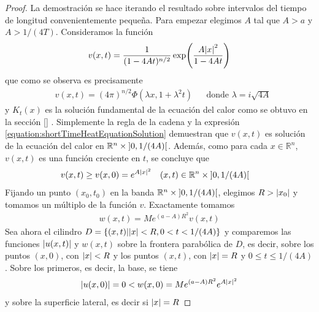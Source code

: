 \documentclass{article}
\newcommand{\realNumbers}{\mathbb{R}}
\theoremstyle{definition}
\theoremstyle{remark}
\newcommand{\leftOpenInterval}{\left]}
\newcommand{\rightOpenInterval}{\right[}
\newcommand{\leftClosedInterval}{\left[}
\newcommand{\rightClosedInterval}{\right]}
\newcommand{\interval}[3]{%
  \ifstrequal{#1}{oo}{%
    \leftOpenInterval #2, #3 \rightOpenInterval%
  }{%
    \ifstrequal{#1}{co}{%
      \leftClosedInterval #2, #3 \rightOpenInterval%
    }{%
      \ifstrequal{#1}{oc}{
        \leftOpenInterval #2, #3 \rightClosedInterval%
      }{%
        \ifstrequal{#1}{cc}{
          \leftClosedInterval #2, #3 \rightClosedInterval
        }{%
        }%
      }%
    }%
  }%
}
\begin{document}
  \begin{proof}
    La demostración se hace iterando el resultado sobre intervalos del tiempo de longitud convenientemente pequeña.
    Para empezar elegimos \(A\) tal que \(A > a\) y 
    \(A > 1 / (4 T)\).  %
    Consideramos la función
    \begin{align}
      v(x, t) = \frac{1}{(1 - 4 A t)^{n / 2}} \exp\!\left(\frac{A \abs{x}^2}{1 - 4 A t}\right)
    \end{align}
    que como se observa es precisamente
    \begin{align}
      \label{equation:shortTimeHeatEquationSolution}
      &v(x, t)
      =
      (4 \pi)^{n / 2} \Phi(\lambda x, 1 + \lambda^2 t)
      && \text{donde } \lambda = i \sqrt{4A}
    \end{align}
    y \(K_t(x)\) es la solución fundamental de la ecuación del calor como se obtuvo en la sección 
    \ref{}  %
    .
    Simplemente la regla de la cadena y la expresión
    \ref{equation:shortTimeHeatEquationSolution}
    demuestran que \(v(x, t)\) es solución de la ecuación del calor en \(\realNumbers^n \times \interval{oo}{0}{1 / (4 A)}\).
    Además, como para cada \(x \in \realNumbers^n\), \(v(x, t)\) es una función creciente en \(t\), se concluye que
    \begin{align}
      &v(x, t)
      \geq
      v(x, 0)
      =
      e^{A \abs{x}^2}
      && (x, t) \in \realNumbers^n \times \interval{oo}{0}{1 / (4 A)}
    \end{align}
    Fijando un punto \((x_0, t_0)\) en la banda \(\realNumbers^n \times \interval{oo}{0}{1 / (4 A)}\), elegimos \(R > \abs{x_0}\) y tomamos un múltiplo de la función \(v\).
    Exactamente tomamos
    \begin{align}
      w(x, t)
      =
      M e^{(a - A) R^2} v(x, t)
    \end{align}
    Sea ahora el cilindro \(D = \{(x, t) | \abs{x} < R, 0 < t < 1 / (4 A)\}\) y comparemos las funciones \(\abs{u(x, t)}\) y \(w(x, t)\) sobre la frontera parabólica de \(D\), es decir, sobre los puntos \((x, 0)\), con \(\abs{x} < R\) y los puntos \((x, t)\), con \(\abs{x} = R\) y \(0 \leq t \leq 1 / (4 A)\).
    Sobre los primeros, es decir, la base, se tiene 
    \begin{align}
      \abs{u(x, 0)}
      =
      0
      <
      w(x, 0)
      =
      M e^{(a - A) R^2} e^{A \abs{x}^2}
    \end{align}
    y sobre la superficie lateral, es decir si \(\abs{x} = R\)

\end{proof}
\end{document}
